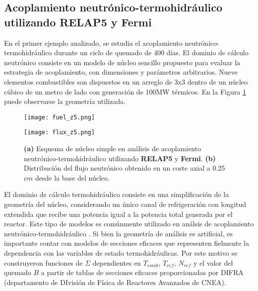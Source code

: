\subsection*{Acoplamiento neutrónico-termohidráulico utilizando \textbf{RELAP5} y \textbf{Fermi}}
\label{3:relap-fermi}

En el primer ejemplo analizado, se estudia el acoplamiento neutrónico-termohidráulico durante un ciclo de quemado de 400 días.
El dominio de cálculo neutrónico consiste en un modelo de núcleo sencillo propuesto para evaluar la estrategia de acoplamiento,
con dimensiones y parámetros arbitrarios.
Nueve elementos combustibles son dispuestos en un arreglo de 3x3 dentro de un núcleo cúbico de un metro de lado con generación de 100MW térmicos.
En la Figura \ref{fuel_z5} puede observarse la geometría utilizada.

\begin{figure}[ht]
	\begin{minipage}{0.5\linewidth}
		\centering
		\texttt{[image: fuel\_z5.png]}
	\end{minipage}
	\begin{minipage}{0.5\linewidth}
		\centering
		\texttt{[image: flux\_z5.png]}
	\end{minipage}
\caption[Núcleo simple en análisis de acoplamiento neutrónico-termohidráulico utilizando \textit{RELAP5} y \textit{Fermi}]
{\textbf{(a)} Esquema de núcleo simple en análisis de acoplamiento neutrónico-termohidráulico utilizando \textbf{RELAP5} y \textbf{Fermi}.
\textbf{(b)} Distribución del flujo neutrónico obtenido en un corte axial a 0.25 $cm$ desde la base del núcleo.
}
\label{fuel_z5}
\end{figure}
El dominio de cálculo termohidráulico consiste en una simplificación de la geometría del núcleo,
considerando un único canal de refrigeración con longitud extendida que recibe una potencia igual a la potencia total generada por el reactor.
Este tipo de modelos es comúnmente utilizado en análsis de acoplamiento neutrónico-termohidráulico \cite{pumita-relap}.
Si bien la geometría de análisis es artificial, 
es importante contar con modelos de secciones eficaces que representen fielmente la dependencia con las variables de estado termohidráulicas.
Por este motivo se construyeron funciones de $\Sigma$ dependientes en $T_{comb}$, $T_{ref}$, $N_{ref}$ y el valor del quemado $B$
a partir de tablas de secciones eficaces proporcionadas por DIFRA (departamento de DIvisión de Física de Reactores Avanzados de CNEA).

